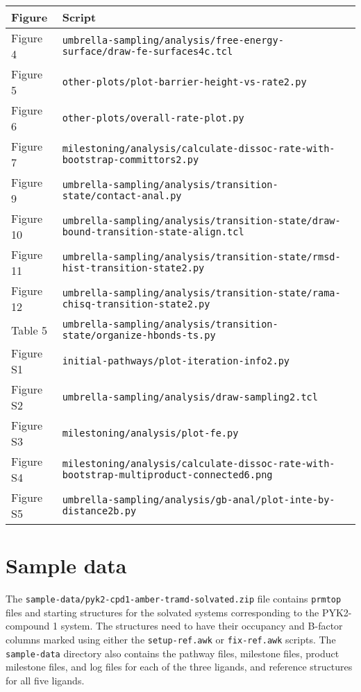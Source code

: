 \documentclass{article}      %
\begin{document}
\begin{tabular}{|l|l|}
\hline 
Figure & Script \\
\hline
Figure 4 & \verb+umbrella-sampling/analysis/free-energy-surface/draw-fe-surfaces4c.tcl+ \\ %
Figure 5 & \verb+other-plots/plot-barrier-height-vs-rate2.py+ \\ %
Figure 6 & \verb+other-plots/overall-rate-plot.py+ \\ %
Figure 7 & \verb+milestoning/analysis/calculate-dissoc-rate-with-bootstrap-committors2.py+ \\
Figure 9 & \verb+umbrella-sampling/analysis/transition-state/contact-anal.py+\\ %
Figure 10 & \verb+umbrella-sampling/analysis/transition-state/draw-bound-transition-state-align.tcl+ \\ %
Figure 11 & \verb+umbrella-sampling/analysis/transition-state/rmsd-hist-transition-state2.py+ \\ %
Figure 12 & \verb+umbrella-sampling/analysis/transition-state/rama-chisq-transition-state2.py+ \\ %
Table 5 & \verb+umbrella-sampling/analysis/transition-state/organize-hbonds-ts.py+  \\ %
Figure S1 & \verb+initial-pathways/plot-iteration-info2.py+ \\ %
Figure S2 & \verb+umbrella-sampling/analysis/draw-sampling2.tcl+ \\ %
Figure S3 & \verb+milestoning/analysis/plot-fe.py+ \\ %
Figure S4 & \verb+milestoning/analysis/calculate-dissoc-rate-with-bootstrap-multiproduct-connected6.png+\\ %
Figure S5 & \verb+umbrella-sampling/analysis/gb-anal/plot-inte-by-distance2b.py+ \\ %
\hline
\end{tabular}
\section{Sample data}

The \verb+sample-data/pyk2-cpd1-amber-tramd-solvated.zip+ file contains \verb+prmtop+ files and starting structures for the solvated systems corresponding to the PYK2-compound 1 system.  The structures need to have their occupancy and B-factor columns marked using either the \verb+setup-ref.awk+ or \verb+fix-ref.awk+ scripts.  The \verb+sample-data+ directory also contains the pathway files, milestone files, product milestone files, and log files for each of the three ligands, and reference structures for all five ligands.
\end{document}
